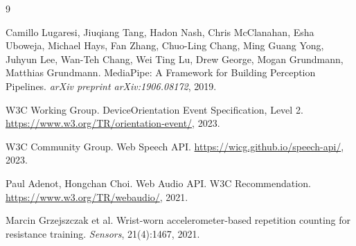 \documentclass[11pt]{article}
\begin{document}
\twocolumn
\begin{thebibliography}{9}


Camillo Lugaresi, Jiuqiang Tang, Hadon Nash, Chris McClanahan, Esha Uboweja, Michael Hays, Fan Zhang, Chuo-Ling Chang, Ming Guang Yong, Juhyun Lee, Wan-Teh Chang, Wei Ting Lu, Drew George, Mogan Grundmann, Matthias Grundmann.
\newblock MediaPipe: A Framework for Building Perception Pipelines.
\newblock \textit{arXiv preprint arXiv:1906.08172}, 2019.

W3C Working Group.
\newblock DeviceOrientation Event Specification, Level 2.
\newblock \url{https://www.w3.org/TR/orientation-event/}, 2023.

W3C Community Group.
\newblock Web Speech API.
\newblock \url{https://wicg.github.io/speech-api/}, 2023.

Paul Adenot, Hongchan Choi.
\newblock Web Audio API.
\newblock W3C Recommendation. \url{https://www.w3.org/TR/webaudio/}, 2021.

Marcin Grzejszczak et al.
\newblock Wrist-worn accelerometer-based repetition counting for resistance training.
\newblock \textit{Sensors}, 21(4):1467, 2021.

\end{thebibliography}
\end{document}
